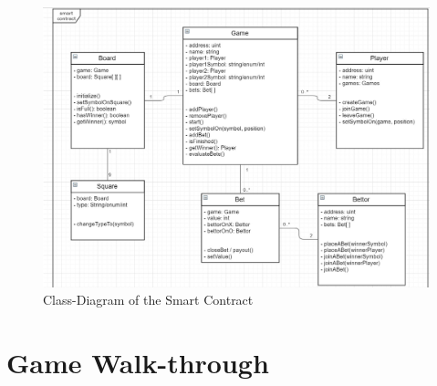 	\begin{figure}[ht]
		\begin{center}
			\includegraphics[scale=0.22]{res/sc_uml}
		\end{center}
		\caption{Class-Diagram of the Smart Contract}
		\label{fig:sc_uml}
	\end{figure}
\section{Game Walk-through}
